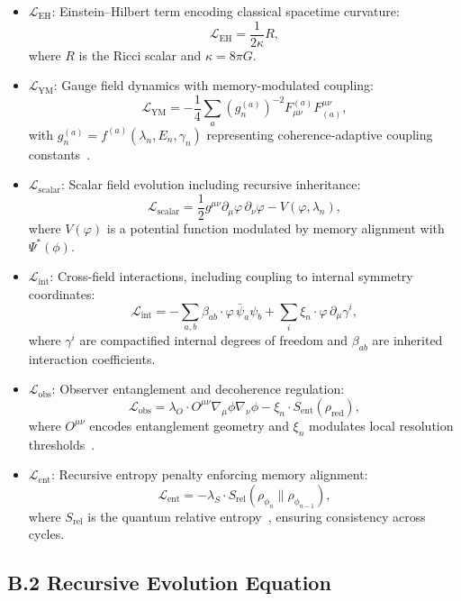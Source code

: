 \documentclass[11pt]{article}
\begin{document}
\begin{itemize}[leftmargin=1.5em]
\item $\mathcal{L}_{\text{EH}}$: Einstein–Hilbert term encoding classical spacetime curvature:
\[
\mathcal{L}_{\text{EH}} = \frac{1}{2\kappa} R,
\]
where \( R \) is the Ricci scalar and \( \kappa = 8\pi G \).

\item $\mathcal{L}_{\text{YM}}$: Gauge field dynamics with memory-modulated coupling:
\[
\mathcal{L}_{\text{YM}} = -\frac{1}{4} \sum_a \left( g_n^{(a)} \right)^{-2} F_{\mu\nu}^{(a)} F^{\mu\nu}_{(a)},
\]
with $g_n^{(a)} = f^{(a)}(\lambda_n, E_n, \gamma_n)$ representing coherence-adaptive coupling constants~\cite{ashtekar2006quantum}.

\item $\mathcal{L}_{\text{scalar}}$: Scalar field evolution including recursive inheritance:
\[
\mathcal{L}_{\text{scalar}} = \frac{1}{2} g^{\mu\nu} \partial_\mu \varphi \, \partial_\nu \varphi - V(\varphi, \lambda_n),
\]
where \( V(\varphi) \) is a potential function modulated by memory alignment with $\Psi^*(\phi)$.

\item $\mathcal{L}_{\text{int}}$: Cross-field interactions, including coupling to internal symmetry coordinates:
\[
\mathcal{L}_{\text{int}} = - \sum_{a,b} \beta_{ab} \cdot \varphi \, \bar{\psi}_a \psi_b + \sum_{i} \xi_n \cdot \varphi \, \partial_\mu \gamma^i,
\]
where \( \gamma^i \) are compactified internal degrees of freedom and $\beta_{ab}$ are inherited interaction coefficients.

\item $\mathcal{L}_{\text{obs}}$: Observer entanglement and decoherence regulation:
\[
\mathcal{L}_{\text{obs}} = \lambda_O \cdot O^{\mu\nu} \nabla_\mu \phi \nabla_\nu \phi - \xi_n \cdot S_{\text{ent}}(\rho_{\text{red}}),
\]
where $O^{\mu\nu}$ encodes entanglement geometry and $\xi_n$ modulates local resolution thresholds~\cite{zurek2003decoherence}.

\item $\mathcal{L}_{\text{ent}}$: Recursive entropy penalty enforcing memory alignment:
\[
\mathcal{L}_{\text{ent}} = - \lambda_S \cdot S_{\text{rel}}(\rho_{\phi_n} \| \rho_{\phi_{n-1}}),
\]
where $S_{\text{rel}}$ is the quantum relative entropy~\cite{nielsen2010quantum}, ensuring consistency across cycles.
\end{itemize}

\subsection*{B.2 Recursive Evolution Equation}
\end{document}
